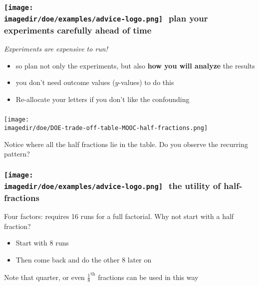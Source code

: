 \begin{frame}\frametitle{\texttt{[image: \\imagedir/doe/examples/advice-logo.png]}\,\, plan your experiments carefully ahead of time}
	
	\vspace{24pt}
	{\color{myOrange} 	\emph{Experiments are expensive to run!}}
	

	\begin{exampleblock}{}
		\vspace{12pt}
		\begin{itemize}
			\item	so plan not only the experiments, but also \textbf{how you will analyze} the results
			\item	you don't need outcome values ($y$-values) to do this
			
			\vspace{1cm}

			\item	Re-allocate your letters if you don't like the confounding
		\end{itemize} 
	\end{exampleblock}
	
\end{frame}

\begin{frame}\frametitle{}
	\vspace{-0.5cm}
	\texttt{[image: \\imagedir/doe/DOE-trade-off-table-MOOC-half-fractions.png]}
	
	\vspace{10pt}
	Notice where all the half fractions lie in the table. Do you observe the recurring pattern?
\end{frame}

\begin{frame}\frametitle{\texttt{[image: \\imagedir/doe/examples/advice-logo.png]}\,\, the utility of half-fractions}
	
	\vspace{24pt}
	Four factors: requires 16 runs for a full factorial. Why not start with a half fraction?
	
	\vspace{24pt}
	\begin{itemize}
		\item	Start with 8 runs
		\item	Then come back and do the other 8 later on
	\end{itemize}
	
	\vspace{24pt}
	{\color{myOrange} Note that quarter, or even $\tfrac{1}{8}^\text{th}$ fractions can be used in this way}
	
\end{frame}

